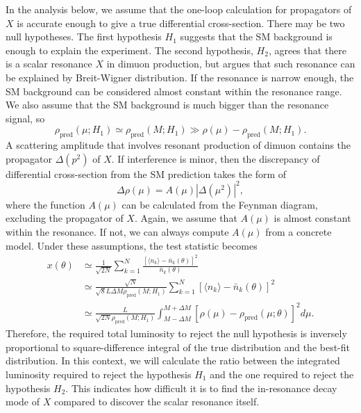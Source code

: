 \documentclass[11pt]{article}
\theoremstyle{definition}
\theoremstyle{remark}
\begin{document}
	In the analysis below, we assume that the one-loop calculation for propagators of $X$ is accurate enough to give a true differential cross-section.
	There may be two null hypotheses.
	The first hypothesis $H_{1}$ suggests that the SM background is enough to explain the experiment.
	The second hypothesis, $H_{2}$, agrees that there is a scalar resonance $X$ in dimuon production, but argues that such resonance can be explained by Breit-Wigner distribution.
	If the resonance is narrow enough, the SM background can be considered almost constant within the resonance range.
	We also assume that the SM background is much bigger than the resonance signal, so
	\[\rho_{\text{pred}}(\mu;H_{1})\simeq\rho_{\text{pred}}(M;H_{1})\gg\rho(\mu)-\rho_{\text{pred}}(M;H_{1}).\]
	A scattering amplitude that involves resonant production of dimuon contains the propagator $\Delta(p^{2})$ of $X$.
	If interference is minor, then the discrepancy of differential cross-section from the SM prediction takes the form of
	\[\Delta\rho(\mu)=A(\mu)|\Delta(\mu^{2})|^{2},\]
	where the function $A(\mu)$ can be calculated from the Feynman diagram, excluding the propagator of $X$.
	Again, we assume that $A(\mu)$ is almost constant within the resonance.
	If not, we can always compute $A(\mu)$ from a concrete model.
	Under these assumptions, the test statistic becomes
	\begin{align*}
		x(\theta)&\simeq\frac{1}{\sqrt{2N}}\sum_{k=1}^{N}\frac{[\langle n_{k}\rangle-\bar{n}_{k}(\theta)]^{2}}{\bar{n}_{k}(\theta)}\\
		&\simeq\frac{\sqrt{N}}{\sqrt{8}L\Delta M\rho_{\text{pred}}(M;H_{1})}\sum_{k=1}^{N}[\langle n_{k}\rangle-\bar{n}_{k}(\theta)]^{2}\\
		&\simeq\frac{L}{\sqrt{2N}\rho_{\text{pred}}(M;H_{1})}\int_{M-\Delta M}^{M+\Delta M}[\rho(\mu)-\rho_{\text{pred}}(\mu;\theta)]^{2}d\mu.
	\end{align*}
	Therefore, the required total luminosity to reject the null hypothesis is inversely proportional to square-difference integral of the true distribution and the best-fit distribution.
	In this context, we will calculate the ratio between the integrated luminosity required to reject the hypothesis $H_{1}$ and the one required to reject the hypothesis $H_{2}$.
	This indicates how difficult it is to find the in-resonance decay mode of $X$ compared to discover the scalar resonance itself.
	
\end{document}
